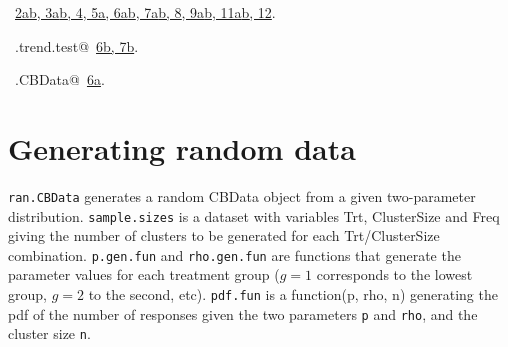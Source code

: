 \documentclass[reqno]{amsart}
\renewcommand{\NWlink}[2]{\hyperlink{#1}{#2}}
\begin{document}
\begin{flushleft}
\begin{list}{}{}
\end{list}
\vspace{-1.5ex}
\footnotesize
\begin{list}{}{\setlength{\itemsep}{-\parsep}\setlength{\itemindent}{-\leftmargin}}
\item \NWtxtFileDefBy\ \NWlink{nuweb2a}{2a}\NWlink{nuweb2b}{b}\NWlink{nuweb3a}{, 3a}\NWlink{nuweb3b}{b}\NWlink{nuweb4}{, 4}\NWlink{nuweb5a}{, 5a}\NWlink{nuweb6a}{, 6a}\NWlink{nuweb6b}{b}\NWlink{nuweb7a}{, 7a}\NWlink{nuweb7b}{b}\NWlink{nuweb8}{, 8}\NWlink{nuweb9a}{, 9a}\NWlink{nuweb9b}{b}\NWlink{nuweb11a}{, 11a}\NWlink{nuweb11b}{b}\NWlink{nuweb12}{, 12}.
\item \NWtxtIdentsDefed\nobreak\  \verb@GEE.trend.test@\nobreak\ \NWlink{nuweb6b}{6b}\NWlink{nuweb7b}{, 7b}.\item \NWtxtIdentsUsed\nobreak\  \verb@unwrap.CBData@\nobreak\ \NWlink{nuweb6a}{6a}.
\item{}
\end{list}
\vspace{4ex}
\end{flushleft}
\section{Generating random data}
\texttt{ran.CBData} generates a random CBData object from a given two-parameter
distribution. \texttt{sample.sizes} is a dataset with variables Trt, ClusterSize and
Freq giving the number of clusters to be generated for each Trt/ClusterSize combination.
\texttt{p.gen.fun} and \texttt{rho.gen.fun} are functions that generate the parameter
values for each treatment group ($g=1$ corresponds to the lowest group, $g=2$ to the
second, etc). \texttt{pdf.fun} is a function(p, rho, n) generating the pdf of the
number of responses given the two parameters \texttt{p} and \texttt{rho}, and the
cluster size \texttt{n}.
\end{document}
